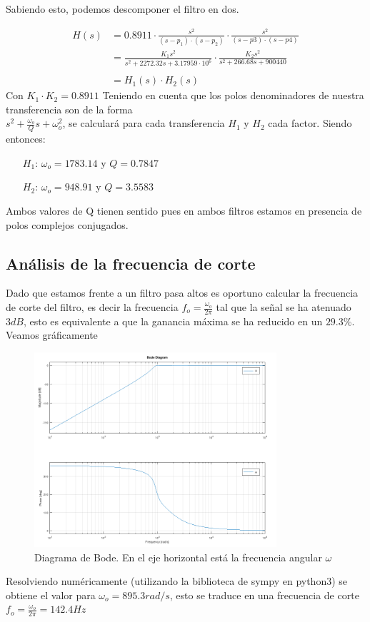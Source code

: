 Sabiendo esto, podemos descomponer el filtro en dos.

\begin{align*}
    H(s) & = 0.8911 \cdot \frac{s^2}{(s-p_1)\cdot(s-p_2)} \cdot \frac{s^2}{(s-p3)\cdot(s-p4)} \\
         & = \frac{K_1 s^2}{s^2 + 2272.32s+3.17959\cdot10^6} \cdot \frac{K_2 s^2}{s^2+266.68s+900440} \\\\
         & = H_1(s) \cdot H_2(s)
\end{align*}
Con $K_1\cdot K_2 = 0.8911$
\vskip0.5cm
Teniendo en cuenta que los polos denominadores de nuestra transferencia son de la forma  \\$s^2+\frac{\omega_o}{Q}s+\omega_o^2$, se calculará para cada transferencia $H_1$ y $H_2$ cada factor. Siendo entonces:

\begin{itemize}
    \centering
    \item[$H_1$:  ] $\omega_o = 1783.14 $ y $Q = 0.7847$ 
    \item[$H_2$:  ] $\omega_o = 948.91$ y $Q = 3.5583$
\end{itemize}

Ambos valores de Q tienen sentido pues en ambos filtros estamos en presencia de polos complejos conjugados.

\subsection{Análisis de la frecuencia de corte} 
Dado que estamos frente a un filtro pasa altos es oportuno calcular la frecuencia de corte del filtro, es decir la frecuencia $f_o = \frac{\omega_o}{2 \pi}$ tal que la señal se ha atenuado $3dB$, esto es equivalente a que la ganancia máxima se ha reducido en un $29.3\%$. Veamos gráficamente

\begin{figure}[H]
    \centering
    \includegraphics[width=0.8\textwidth]{resources/Bode.png}
    \caption{Diagrama de Bode. En el eje horizontal está la frecuencia angular $\omega$}
\end{figure}

Resolviendo numéricamente (utilizando la biblioteca de sympy en python3) se obtiene el valor para $\omega_o = 895.3 rad/s$, esto se traduce en una frecuencia de corte $f_o = \frac{\omega_o}{2\pi} = 142.4Hz$